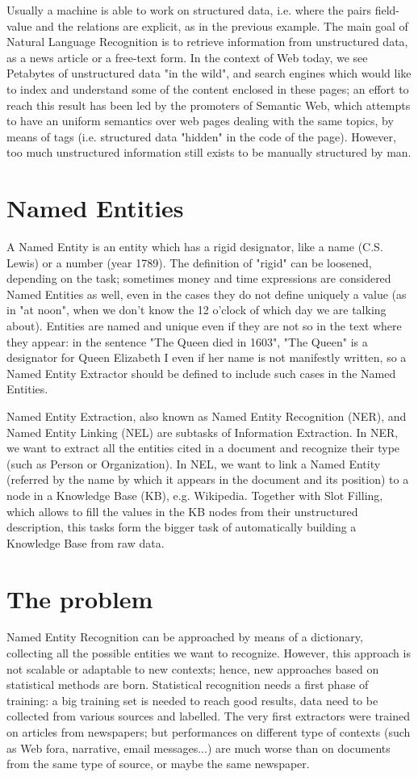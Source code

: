 \documentclass[a4paper,11pt]{report}
\begin{document}
Usually a machine is able to work on structured data, i.e. where the pairs field-value and the relations are explicit, as in the previous example. The main goal of Natural Language Recognition is to retrieve information from unstructured data, as a news article or a free-text form. In the context of Web today, we see Petabytes of unstructured data "in the wild", and search engines which would like to index and understand some of the content enclosed in these pages; an effort to reach this result has been led by the promoters of Semantic Web, which attempts to have an uniform semantics over web pages dealing with the same topics, by means of tags (i.e. structured data "hidden" in the code of the page). However, too much unstructured information still exists to be manually structured by man.

\section{Named Entities}
A Named Entity is an entity which has a rigid designator, like a name (C.S. Lewis) or a number (year 1789). The definition of "rigid" can be loosened, depending on the task; sometimes money and time expressions are considered Named Entities as well, even in the cases they do not define uniquely a value (as in "at noon", when we don't know the 12 o'clock of which day we are talking about). Entities are named and unique even if they are not so in the text where they appear: in the sentence "The Queen died in 1603", "The Queen" is a designator for Queen Elizabeth I even if her name is not manifestly written, so a Named Entity Extractor should be defined to include such cases in the Named Entities.

Named Entity Extraction, also known as Named Entity Recognition (NER), and Named Entity Linking (NEL) are subtasks of Information Extraction. In NER, we want to extract all the entities cited in a document and recognize their type (such as Person or Organization). In NEL, we want to link a Named Entity (referred by the name by which it appears in the document and its position) to a node in a Knowledge Base (KB), e.g. Wikipedia. Together with Slot Filling, which allows to fill the values in the KB nodes from their unstructured description, this tasks form the bigger task of automatically building a Knowledge Base from raw data.

\section{The problem}
Named Entity Recognition can be approached by means of a dictionary, collecting all the possible entities we want to recognize. However, this approach is not scalable or adaptable to new contexts; hence, new approaches based on statistical methods are born. Statistical recognition needs a first phase of training: a big training set is needed to reach good results, data need to be collected from various sources and labelled. The very first extractors were trained on articles from newspapers; but performances on different type of contexts (such as Web fora, narrative, email messages...) are much worse than on documents from the same type of source, or maybe the same newspaper.
\end{document}
